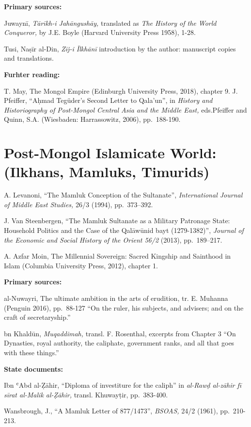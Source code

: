 \documentclass[
]{book}
\begin{document}
\textbf{Primary sources:}

Juwaynī, \emph{Tārīkh-i Jahāngushāy,} translated as \emph{The History of the World Conqueror,} by J.E. Boyle (Harvard University Press 1958), 1-28.

Tusi, Naṣīr al-Din, \emph{Zīj-i Īlkhānī} introduction by the author: manuscript copies and translations.

\textbf{Furhter reading:}

T. May, The Mongol Empire (Edinburgh University Press, 2018), chapter 9.
J. Pfeiffer, ``Aḥmad Tegüder's Second Letter to Qala'un'', in \emph{History and Historiography of Post-Mongol Central Asia and the Middle East,} eds.Pfeiffer and Quinn, S.A. (Wiesbaden: Harrassowitz, 2006), pp.~188-190.

\hypertarget{post-mongol-islamicate-world-ilkhans-mamluks-timurids}{%
\chapter{Post-Mongol Islamicate World: (Ilkhans, Mamluks, Timurids)}\label{post-mongol-islamicate-world-ilkhans-mamluks-timurids}}

A. Levanoni, ``The Mamluk Conception of the Sultanate'', \emph{International Journal of Middle East Studies,} 26/3 (1994), pp.~373--392.

J. Van Steenbergen, ``The Mamluk Sultanate as a Military Patronage State: Household Politics and the Case of the Qalāwūnid bayt (1279-1382)'', \emph{Journal of the Economic and Social History of the Orient 56/2} (2013), pp.~189--217.

A. Azfar Moin, The Millennial Sovereign: Sacred Kingship and Sainthood in Islam (Columbia University Press, 2012), chapter 1.

\textbf{Primary sources:}

al-Nuwayri, The ultimate ambition in the arts of erudition, tr. E. Muhanna (Penguin 2016), pp.~88-127 ``On the ruler, his subjects, and advisers; and on the craft of secretaryship.''

bn Khaldūn, \emph{Muqaddimah,} transl. F. Rosenthal, excerpts from Chapter 3 ``On Dynasties, royal authority, the caliphate, government ranks, and all that goes with these things.''

\textbf{State documents:}

Ibn ʿAbd al-Ẓāhir, ``Diploma of investiture for the caliph'' in \emph{al-Rawḍ al-zāhir fī sīrat al-Malik al-Ẓāhir,} transl. Khuwayṭir, pp.~383-400.

Wansbrough, J., ``A Mamluk Letter of 877/1473'', \emph{BSOAS,} 24/2 (1961), pp.~210-213.
\end{document}
